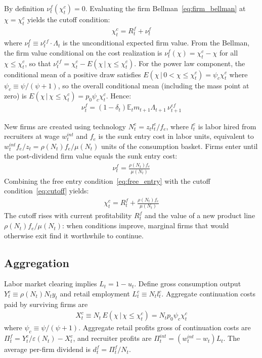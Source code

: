 \documentclass[authoryear, review, 12pt]{elsarticle}
\begin{document}
	By definition $\nu_t^f(\chi_t^c)=0$. Evaluating 
	the firm Bellman~\eqref{eq:firm_bellman} at 
	$\chi=\chi_t^c$ yields the cutoff condition:
	\begin{align}\label{eq:cutoff}
		\chi_t^c = R_t^f + \nu_t^f
	\end{align}
	where $\nu_t^f\equiv\nu_t^{ef}\cdot\Lambda_t$ is the 
	unconditional expected firm value. From the Bellman, 
	the firm value conditional on the cost realization is 
	$\nu_t^f(\chi)=\chi_t^c-\chi$ for all $\chi\leq\chi_t^c$, 
	so that $\nu_t^{ef}=\chi_t^c - E(\chi\,|\,\chi\leq\chi_t^c)$. 
	For the power law component, the conditional mean of a 
	positive draw satisfies $E(\chi\,|\,0<\chi\leq\chi_t^c)
	=\psi_c\chi_t^c$ where $\psi_c\equiv\psi/(\psi+1)$, 
	so the overall conditional mean (including the mass point 
	at zero) is $E(\chi\,|\,\chi\leq\chi_t^c)=p_0\psi_c\chi_t^c$. 
	Hence:
	\begin{align}\label{eq:firm_value_char}
		\nu_t^f = (1-\delta_t)\mathbb{E}_t m_{t+1}
		\Lambda_{t+1}\,\nu_{t+1}^{ef}
	\end{align}
	
	New firms are created using technology $N_t^e=z_t l_t^e/f_e$, 
	where $l_t^e$ is labor hired from recruiters at wage 
	$w_t^{int}$ and $f_e$ is the sunk entry cost in labor units, 
	equivalent to $w_t^{int}f_e/z_t=\rho(N_t)f_e/\mu(N_t)$ 
	units of the consumption basket. Firms enter until the 
	post-dividend firm value equals the sunk entry cost:
	\begin{align}\label{eq:free_entry}
		\nu_t^f = \frac{\rho(N_t)f_e}{\mu(N_t)}
	\end{align}
	Combining the free entry condition~\eqref{eq:free_entry} 
	with the cutoff condition~\eqref{eq:cutoff} yields:
	\begin{align}\label{eq:cutoff_free_entry}
		\chi_t^c = R_t^f + \frac{\rho(N_t)f_e}{\mu(N_t)}
	\end{align}
	The cutoff rises with current profitability $R_t^f$ and 
	the value of a new product line $\rho(N_t)f_e/\mu(N_t)$: 
	when conditions improve, marginal firms that would 
	otherwise exit find it worthwhile to continue.
	\subsection{Aggregation}\label{sec:aggregation}
	
	Labor market clearing implies $L_t = 1-u_t$. Define 
	gross consumption output $Y_t^c \equiv \rho(N_t)N_t y_t$ 
	and retail employment $L_t^c \equiv N_t l_t^c$. Aggregate 
	continuation costs paid by surviving firms are
	\begin{align}\label{eq:agg_fixed_costs}
		X_t^c \equiv N_t\,E(\chi\,|\,\chi\leq\chi_t^c) 
		= N_t p_0\psi_c\chi_t^c
	\end{align}
	where $\psi_c\equiv\psi/(\psi+1)$. Aggregate retail profits 
	gross of continuation costs are $\Pi_t^f = Y_t^c/
	\varepsilon(N_t) - X_t^c$, and recruiter profits are 
	$\Pi_t^{int} = (w_t^{int}-w_t)L_t$. The average per-firm 
	dividend is $d_t^f = \Pi_t^f/N_t$.
	
\end{document}
